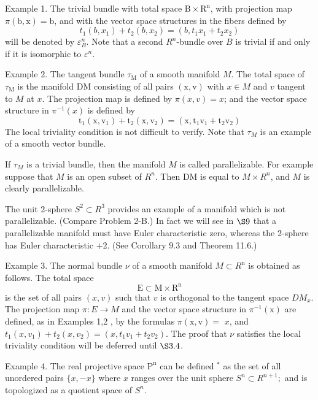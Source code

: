 \documentclass[10pt]{article}
\begin{document}
Example 1. The trivial bundle with total space $\mathrm{B} \times \mathrm{R}^{\mathrm{n}}$, with projection map $\pi(\mathrm{b}, \mathrm{x})=\mathrm{b}$, and with the vector space structures in the fibers defined by
$$
t_{1}\left(b, x_{1}\right)+t_{2}\left(b, x_{2}\right)=\left(b, t_{1} x_{1}+t_{2} x_{2}\right)
$$
will be denoted by $\varepsilon_{B}^{n}$. Note that a second $R^{n}$-bundle over $B$ is trivial if and only if it is isomorphic to $\varepsilon^{n}$.

Example 2. The tangent bundle $\tau_{\mathrm{M}}$ of a smooth manifold $M$. The total space of $\tau_{\mathrm{M}}$ is the manifold $\mathrm{DM}$ consisting of all pairs $(\mathrm{x}, \mathrm{v})$ with $x \in M$ and $v$ tangent to $M$ at $x$. The projection map is defined by $\pi(x, v)=x$; and the vector space structure in $\pi^{-1}(x)$ is defined by
$$
\mathrm{t}_{1}\left(\mathrm{x}, \mathrm{v}_{1}\right)+\mathrm{t}_{2}\left(\mathrm{x}, \mathrm{v}_{2}\right)=\left(\mathrm{x}, \mathrm{t}_{1} \mathrm{v}_{1}+\mathrm{t}_{2} \mathrm{v}_{2}\right)
$$
The local triviality condition is not difficult to verify. Note that $\tau_{M}$ is an example of a smooth vector bundle.

If $\tau_{M}$ is a trivial bundle, then the manifold $M$ is called parallelizable. For example suppose that $M$ is an open subset of $R^{n}$. Then DM is equal to $M \times R^{n}$, and $M$ is clearly parallelizable.

The unit 2-sphere $S^{2} \subset R^{3}$ provides an example of a manifold which is not parallelizable. (Compare Problem 2-B.) In fact we will see in $\S 9$ that a parallelizable manifold must have Euler characteristic zero, whereas the 2-sphere has Euler characteristic $+2$. (See Corollary $9.3$ and Theorem 11.6.)

Example 3. The normal bundle $\nu$ of a smooth manifold $M \subset R^{\mathrm{n}}$ is obtained as follows. The total space
$$
\mathrm{E} \subset \mathrm{M} \times \mathrm{R}^{\mathrm{n}}
$$
is the set of all pairs $(x, v)$ such that $v$ is orthogonal to the tangent space $D M_{x}$. The projection map $\pi: E \rightarrow M$ and the vector space structure in $\pi^{-1}(\mathrm{x})$ are defined, as in Examples 1,2 , by the formulas $\pi(\mathrm{x}, \mathrm{v})=$ $x$, and $t_{1}\left(x, v_{1}\right)+t_{2}\left(x, v_{2}\right)=\left(x, t_{1} v_{1}+t_{2} v_{2}\right)$. The proof that $\nu$ satisfies the local triviality condition will be deferred until $\S 3.4$.

Example 4. The real projective space $\mathrm{P}^{\mathrm{n}}$ can be defined ${ }^{*}$ as the set of all unordered pairs $\{x,-x\}$ where $x$ ranges over the unit sphere $S^{n} \subset R^{n+1} ;$ and is topologized as a quotient space of $S^{n}$.
\end{document}
